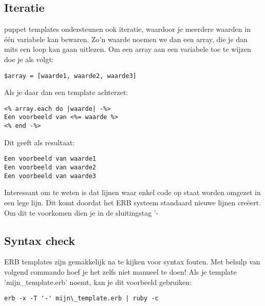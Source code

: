 \subsection{Iteratie}
puppet templates ondersteunen ook iteratie, waardoor je meerdere waarden in \'{e}\'{e}n variabele kan bewaren. Zo'n waarde noemen we dan een array, die je dan mits een loop kan gaan uitlezen. Om een array aan een variabele toe te wijzen doe je als volgt:
\begin{code}
\begin{lstlisting}
$array = [waarde1, waarde2, waarde3]
\end{lstlisting}
\end{code}
Als je daar dan een template achterzet:
\begin{code}
\begin{lstlisting}
<% array.each do |waarde| -%>
Een voorbeeld van <%= waarde %>
<% end -%>
\end{lstlisting}
\end{code}
Dit geeft als resultaat:
\begin{code}
\begin{lstlisting}
Een voorbeeld van waarde1
Een voorbeeld van waarde2
Een voorbeeld van waarde3
\end{lstlisting}
\end{code}
Interessant om te weten is dat lijnen waar enkel code op staat worden omgezet in een lege lijn. Dit komt doordat het ERB systeem standaard nieuwe lijnen cre\"{e}ert. Om dit te voorkomen dien je in de sluitingstag '-%
\subsection{Syntax check}
ERB templates zijn gemakkelijk na te kijken voor syntax fouten. Met behulp van volgend commando hoef je het zelfs niet manueel te doen! Als je template 'mijn\_template.erb' noemt, kan je dit voorbeeld gebruiken:
\begin{code}
\begin{lstlisting}
erb -x -T '-' mijn\_template.erb | ruby -c
\end{lstlisting}
\end{code}
